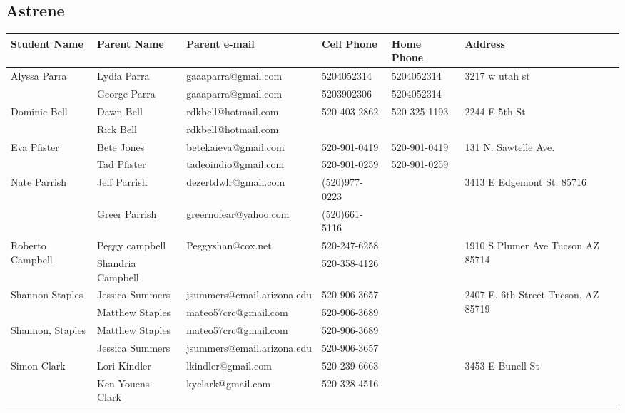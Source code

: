 \documentclass[landscape]{article}\usepackage[]{graphicx}\usepackage[]{color}
\begin{document}
\subsection{Astrene}
\begin{longtable}{|p{100pt}|p{100pt}|p{140pt}|p{60pt}|p{64pt}|p{120pt}|}
\textbf{Student Name} & \textbf{Parent Name} & \textbf{Parent e-mail} & \textbf{Cell Phone} & \textbf{Home Phone} & \textbf{Address}\\
\hline
\hline
\multirow{2}{100pt}{Alyssa Parra} & Lydia Parra & gaaaparra@gmail.com & 5204052314 & 5204052314 & \multirow{2}{120pt}{3217 w utah st} \\
 & George Parra & gaaaparra@gmail.com & 5203902306 & 5204052314 & \\
\hline
\multirow{2}{100pt}{Dominic Bell} & Dawn Bell & rdkbell@hotmail.com & 520-403-2862 & 520-325-1193 & \multirow{2}{120pt}{2244 E 5th St} \\
 & Rick Bell & rdkbell@hotmail.com &  &  & \\
\hline
\multirow{2}{100pt}{Eva Pfister} & Bete Jones & betekaieva@gmail.com & 520-901-0419 & 520-901-0419 & \multirow{2}{120pt}{131 N. Sawtelle Ave.} \\
 & Tad Pfister & tadeoindio@gmail.com & 520-901-0259 & 520-901-0259 & \\
\hline
\multirow{2}{100pt}{Nate Parrish} & Jeff Parrish & dezertdwlr@gmail.com & (520)977-0223 &  & \multirow{2}{120pt}{3413 E Edgemont St. 85716} \\
 & Greer Parrish & greernofear@yahoo.com & (520)661-5116 &  & \\
\hline
\multirow{2}{100pt}{Roberto Campbell } & Peggy campbell & Peggyshan@cox.net & 520-247-6258 &  & \multirow{2}{120pt}{1910 S Plumer Ave Tucson AZ 85714} \\
 & Shandria Campbell  &  & 520-358-4126 &  & \\
\hline
\multirow{2}{100pt}{Shannon Staples} & Jessica Summers & jsummers@email.arizona.edu & 520-906-3657 &  & \multirow{2}{120pt}{2407 E. 6th Street Tucson, AZ  85719} \\
 & Matthew Staples & mateo57crc@gmail.com & 520-906-3689 &  & \\
\hline
\multirow{2}{100pt}{Shannon, Staples} & Matthew Staples & mateo57crc@gmail.com & 520-906-3689 &  & \multirow{2}{120pt}{} \\
 & Jessica Summers & jsummers@email.arizona.edu & 520-906-3657 &  & \\
\hline
\multirow{2}{100pt}{Simon Clark} & Lori Kindler & lkindler@gmail.com & 520-239-6663 &  & \multirow{2}{120pt}{3453 E Bunell St} \\
 & Ken Youens-Clark & kyclark@gmail.com & 520-328-4516 &  & \\
\hline
\end{longtable}
\newpage
\end{document}
